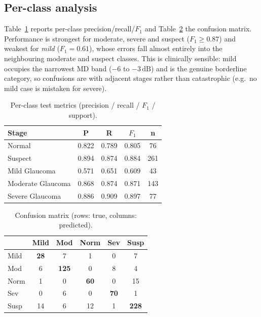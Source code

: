 \documentclass[10pt,twocolumn]{article}
\newcommand{\db}{\,\text{dB}}
\begin{document}
\subsection{Per-class analysis}
Table~\ref{tab:perclass} reports per-class precision/recall/$F_1$ and
Table~\ref{tab:cm} the confusion matrix. Performance is strongest for moderate,
severe and suspect ($F_1\ge0.87$) and weakest for \emph{mild} ($F_1{=}0.61$), whose
errors fall almost entirely into the neighbouring moderate and suspect classes. This
is clinically sensible: mild occupies the narrowest MD band ($-6$ to $-3\db$) and is
the genuine borderline category, so confusions are with adjacent stages rather than
catastrophic (e.g.\ no mild case is mistaken for severe).

\begin{table}[t]
\centering
\caption{Per-class test metrics (precision / recall / $F_1$ / support).}
\label{tab:perclass}
\small
\begin{tabular}{lcccc}
\toprule
Stage & P & R & $F_1$ & n \\
\midrule
Normal            & 0.822 & 0.789 & 0.805 & 76 \\
Suspect           & 0.894 & 0.874 & 0.884 & 261 \\
Mild Glaucoma     & 0.571 & 0.651 & 0.609 & 43 \\
Moderate Glaucoma & 0.868 & 0.874 & 0.871 & 143 \\
Severe Glaucoma   & 0.886 & 0.909 & 0.897 & 77 \\
\bottomrule
\end{tabular}
\end{table}

\begin{table}[t]
\centering
\caption{Confusion matrix (rows: true, columns: predicted).}
\label{tab:cm}
\small
\setlength{\tabcolsep}{4pt}
\begin{tabular}{l|ccccc}
\toprule
 & Mild & Mod & Norm & Sev & Susp \\
\midrule
Mild & \textbf{28} & 7 & 1 & 0 & 7 \\
Mod  & 6 & \textbf{125} & 0 & 8 & 4 \\
Norm & 1 & 0 & \textbf{60} & 0 & 15 \\
Sev  & 0 & 6 & 0 & \textbf{70} & 1 \\
Susp & 14 & 6 & 12 & 1 & \textbf{228} \\
\bottomrule
\end{tabular}
\end{table}
\end{document}
